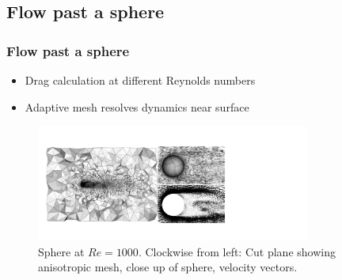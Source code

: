 \subsection{Flow past a sphere}

\begin{frame}
    \frametitle{Flow past a sphere}
\begin{itemize}
\item Drag calculation at different Reynolds numbers
\item Adaptive mesh resolves dynamics near surface
\end{itemize}
\begin{figure}
\centering
\includegraphics[width=0.8\textwidth]{./flow_past_sphere/sphere-Re1000-combined.pdf}
\caption{Sphere at $Re = 1000$. Clockwise from left: Cut plane showing anisotropic mesh, close up of sphere, velocity vectors.}
\end{figure}
\end{frame}

